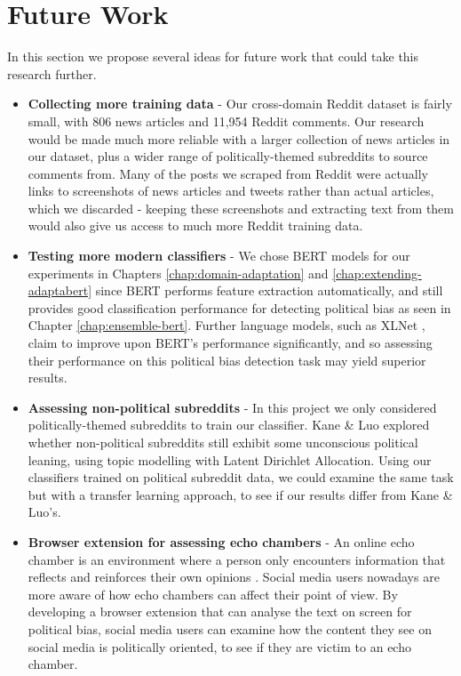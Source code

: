 \section{Future Work}

In this section we propose several ideas for future work that could take this research further.

\begin{itemize}
    \item \textbf{Collecting more training data} - Our cross-domain Reddit dataset is fairly small, with 806 news articles and 11,954 Reddit comments. Our research would be made much more reliable with a larger collection of news articles in our dataset, plus a wider range of politically-themed subreddits to source comments from. Many of the posts we scraped from Reddit were actually links to screenshots of news articles and tweets rather than actual articles, which we discarded - keeping these screenshots and extracting text from them would also give us access to much more Reddit training data.
    \item \textbf{Testing more modern classifiers} - We chose BERT models for our experiments in Chapters \ref{chap:domain-adaptation} and \ref{chap:extending-adaptabert} since BERT performs feature extraction automatically, and still provides good classification performance for detecting political bias as seen in Chapter \ref{chap:ensemble-bert}. Further language models, such as XLNet \cite{xlnet}, claim to improve upon BERT's performance significantly, and so assessing their performance on this political bias detection task may yield superior results.
    \item \textbf{Assessing non-political subreddits} - In this project we only considered politically-themed subreddits to train our classifier. Kane \& Luo \cite{kane} explored whether non-political subreddits still exhibit some unconscious political leaning, using topic modelling with Latent Dirichlet Allocation. Using our classifiers trained on political subreddit data, we could examine the same task but with a transfer learning approach, to see if our results differ from Kane \& Luo's.
    \item \textbf{Browser extension for assessing echo chambers} - An online echo chamber is an environment where a person only encounters information that reflects and reinforces their own opinions \cite{echo-chambers}. Social media users nowadays are more aware of how echo chambers can affect their point of view. By developing a browser extension that can analyse the text on screen for political bias, social media users can examine how the content they see on social media is politically oriented, to see if they are victim to an echo chamber.
\end{itemize}

